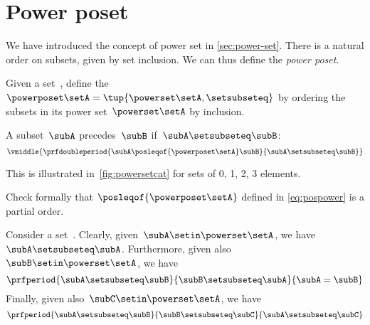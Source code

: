 
\section{Power poset}

We have introduced the concept of power set in \cref{sec:power-set}.
There is a natural order on subsets, given by set inclusion.
We can thus define the \emph{power poset}.

\begin{definition}
    \label{def:power-poset}
    Given a set~\setA, define the ~$\powerposet\setA = \tup{\powerset\setA, \setsubseteq}$ by ordering the subsets in its power set~$\powerset\setA$ by inclusion.

    A subset~$\subA$ precedes~$\subB$ if~$\subA \setsubseteq \subB$:
    \begin{equation} \label{eq:pospower}
        \vmiddle{
            \prfdoubleperiod{
                \subA \posleqof{\powerposet\setA} \subB
            }{
                \subA \setsubseteq \subB
            }
        }
    \end{equation}
\end{definition}
This is illustrated in~\cref{fig:powersetcat} for sets of 0, 1, 2, 3 elements.
\begin{exercise}
    Check formally that $\posleqof{\powerposet\setA}$ defined in \cref{eq:pospower} is a partial order.
\end{exercise}
\begin{solution}
    Consider a set~\setA.
    Clearly, given~$\subA\setin \powerset \setA$, we have~$\subA\setsubseteq \subA$.
    Furthermore, given also~$\subB\setin \powerset \setA$, we have
    \begin{equation}\label{eq:ex-pospower-1}
        \prfperiod{
            \subA\setsubseteq \subB
        }{
            \subB\setsubseteq \subA
        }{
            \subA=\subB
        }
    \end{equation}
    Finally, given also~$\subC\setin \powerset \setA$, we have
    \begin{equation}\label{eq:ex-pospower-2}
        \prfperiod{
            \subA\setsubseteq \subB
        }{
            \subB\setsubseteq \subC
        }{
            \subA\setsubseteq\subC
        }
    \end{equation}
\end{solution}
\vfill
\begin{figure*}[h]
    \centering
    \hfill
    \hfill
    \hfill
    \caption{Power set as a poset.
    }
    \label{fig:powersetcat}
\end{figure*}
\vfill
